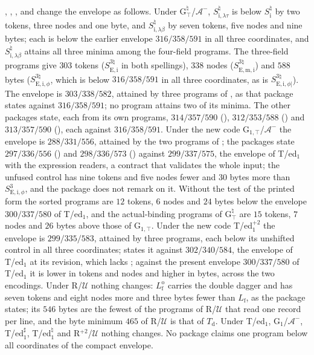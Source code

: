, , ,
 and  change the envelope as
follows. Under G$^{\natural}_{\top}$/$\mathcal A^{-}$, $S^{\natural}_{\mathrm{i},\lambda\tau}$ is below
$S^{\natural}_{\mathrm i}$ by two tokens, three nodes and one byte, and
$S^{\natural}_{\mathrm{i},\lambda\beta}$ by seven tokens, five nodes and nine bytes; each is below
the earlier envelope $316/358/591$ in all three coordinates, and $S^{\natural}_{\mathrm{i},\lambda\beta}$
attains all three minima among the four-field programs. The three-field programs give
$303$ tokens ($S^{3\natural}_{\mathrm{E,i}}$ in both spellings), $338$ nodes
($S^{3\natural}_{\mathrm{E,m,i}}$) and $588$ bytes ($S^{3\natural}_{\mathrm{E,i},\phi}$, which is
below $316/358/591$ in all three coordinates, as is $S^{3\natural}_{\mathrm{E,i},\phi|}$). The
envelope is $303/338/582$, attained by three programs of , as that
package states against $316/358/591$; no program attains two of its minima. The other packages
state, each from its own programs, $314/357/590$ (), $312/353/588$
() and $313/357/590$ (), each against
$316/358/591$. Under the new code G$_{1,\top}$/$\mathcal A^{-}$ the envelope is $288/331/556$,
attained by the two programs of ; the packages state $297/336/556$
() and $298/336/573$ () against
$299/337/575$, the envelope of T/ed$_1$ with the expression readers, a contract that validates the
whole input; the unfused control has nine tokens and five nodes fewer and $30$ bytes more than
$S^{3}_{\mathrm{E,i},\phi}$, and the package does not remark on it. Without the test of the printed
form the sorted programs are $12$ tokens, $6$ nodes and $24$ bytes below the envelope
$300/337/580$ of T/ed$_1$, and the actual-binding programs of G$^{\natural}_{\top}$ are $15$ tokens,
$7$ nodes and $26$ bytes above those of G$_{1,\top}$. Under the new code T/ed$_1^{+2}$ the envelope
is $299/335/583$, attained by three programs, each below its unshifted control in all three
coordinates;  states it against $302/340/584$, the envelope of T/ed$_1$
at its revision, which lacks ; against the present envelope $300/337/580$ of
T/ed$_1$ it is lower in tokens and nodes and higher in bytes, across the two encodings. Under
R/$\mathcal U$ nothing changes: $L^{\mathrm o}_{\mathrm f}$ carries the double dagger and has seven
tokens and eight nodes more and three bytes fewer than $L_{\mathrm f}$, as the package states; its
$546$ bytes are the fewest of the programs of R/$\mathcal U$ that read one record per line, and the byte minimum
$465$ of R/$\mathcal U$ is that of $T_{\mathrm d}$. Under T/ed$_1$, G$_1$/$\mathcal A^{-}$,
T/ed$_1^{\sharp}$, T/ed$_1^{\natural}$ and R$^{+2}$/$\mathcal U$ nothing changes. No package claims one
program below all coordinates of the compact envelope.

